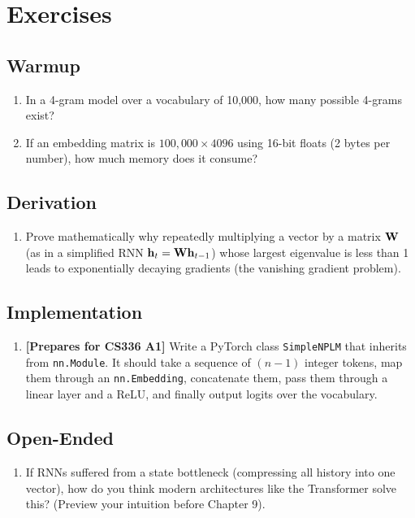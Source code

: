 \section{Exercises}
\label{ch:08:sec:exercises}

\subsection*{Warmup}
\begin{enumerate}
  \item In a 4-gram model over a vocabulary of 10,000, how many possible 4-grams exist? 
  \item If an embedding matrix is $100,000 \times 4096$ using 16-bit floats (2 bytes per number), how much memory does it consume?
\end{enumerate}

\subsection*{Derivation}
\begin{enumerate}
  \item Prove mathematically why repeatedly multiplying a vector by a matrix $\mathbf{W}$ (as in a simplified RNN $\mathbf{h}_t = \mathbf{W} \mathbf{h}_{t-1}$) whose largest eigenvalue is less than 1 leads to exponentially decaying gradients (the vanishing gradient problem).
\end{enumerate}

\subsection*{Implementation}
\begin{enumerate}
  \item \textbf{[Prepares for CS336 A1]} Write a PyTorch class \texttt{SimpleNPLM} that inherits from \texttt{nn.Module}. It should take a sequence of $(n-1)$ integer tokens, map them through an \texttt{nn.Embedding}, concatenate them, pass them through a linear layer and a ReLU, and finally output logits over the vocabulary.
\end{enumerate}

\subsection*{Open-Ended}
\begin{enumerate}
  \item If RNNs suffered from a state bottleneck (compressing all history into one vector), how do you think modern architectures like the Transformer solve this? (Preview your intuition before Chapter 9).
\end{enumerate}


